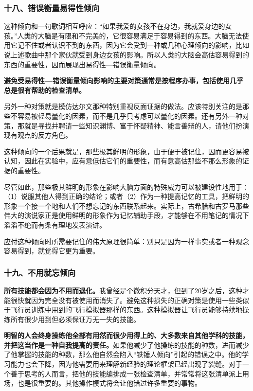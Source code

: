 \subsubsection*{十八、错误衡量易得性倾向}

这种倾向和一句歌词相互呼应：“如果我爱的女孩不在身边，我就爱身边的女孩。”人类的大脑是有限和不完美的，它很容易满足于容易得到的东西。大脑无法使用它记不住或者认识不到的东西，因为它会受到一种或几种心理倾向的影响，比如说上述歌曲中那个家伙就受到身边女孩的影响。所以人类的大脑会高估容易得到的东西的重要性，因而展现出易得性—错误衡量倾向。
\par

\textbf{避免受易得性—错误衡量倾向影响的主要对策通常是按程序办事，包括使用几乎总是很有帮助的检查清单。}
\par

另外一种对策就是模仿达尔文那种特别重视反面证据的做法。应该特别关注的是那些不容易被轻易量化的因素，而不是几乎只考虑可以量化的因素。还有另外一种对策，那就是寻找并聘请一些知识渊博、富于怀疑精神、能言善辩的人，请他们扮演现有观点的反方角色。
\par

这种倾向的一个后果就是，那些极其鲜明的形象，由于便于被记住，因而更容易被认知，因此在实验中，应有意低估它们的重要性，而有意高估那些不那么形象的证据的重要性。
\par

尽管如此，那些极其鲜明的形象在影响大脑方面的特殊威力可以被建设性地用于：（1）说服其他人得到正确的结论；或者（2）作为一种提高记忆的工具，把鲜明的形象一个接一个地和人们不想忘记的东西联系起来。实际上，古希腊和古罗马那些伟大的演说家正是使用鲜明的形象作为记忆辅助手段，才能够在不用笔记的情况下滔滔不绝而有条有理地发表演讲。
\par

应付这种倾向时所需要记住的伟大原理很简单：别只是因为一样事实或者一种观念容易得到，就觉得它更为重要。
\par

\subsubsection*{十九、不用就忘倾向}

\textbf{所有技能都会因为不用而退化。}我曾经是个微积分天才，但到了20岁之后，这种才能很快就因为完全没有被使用而消失了。避免这种损失的正确对策是使用一些类似于飞行员训练中用到的飞行模拟器那样的东西。这种模拟器让飞行员能够持续地操练所有很少用到但必须保证万无一失的技能。
\par

\textbf{明智的人会终身操练他全部有用然而很少用得上的、大多数来自其他学科的技能，并把这当作是一种自我提高的责任。}如果他减少了他操练的技能的种数，进而减少了他掌握的技能的种数，那么他自然会陷入“铁锤人倾向”引起的错误之中。他的学习能力也会下降，因为他需要用来理解新经验的理论框架已经出现了裂缝。对于一个善于思考的人而言，把他的技能编排成一张检查清单，并常常将这张清单派上用场，也是很重要的。其他操作模式将会让他错过许多重要的事物。
\par

